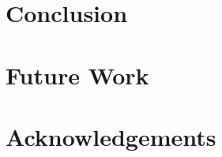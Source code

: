 \documentclass[conference]{IEEEtran}
\begin{document}
\section{Conclusion}


\section{Future Work}


\section{Acknowledgements}

\end{document}

